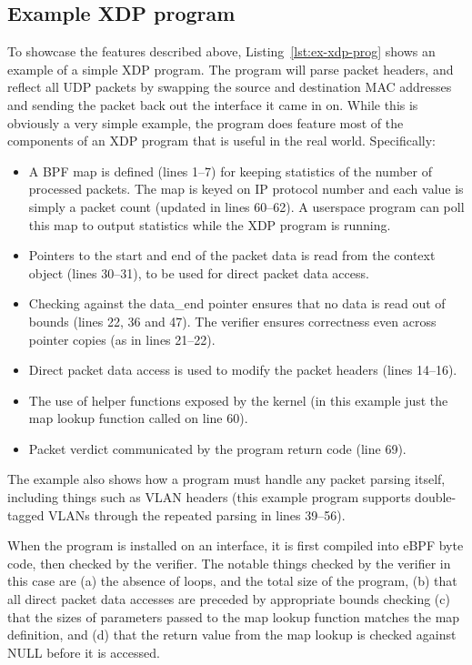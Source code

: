\documentclass[sigconf]{acmart}
\begin{document}
\subsection{Example XDP program}
\label{sec:example-xdp-program}


To showcase the features described above, Listing~\ref{lst:ex-xdp-prog} shows an
example of a simple XDP program. The program will parse packet headers, and
reflect all UDP packets by swapping the source and destination MAC addresses and
sending the packet back out the interface it came in on. While this is obviously
a very simple example, the program does feature most of the components of an XDP
program that is useful in the real world. Specifically:

\begin{itemize}
\item A BPF map is defined (lines 1--7) for keeping statistics of the number of
  processed packets. The map is keyed on IP protocol number and each value is
  simply a packet count (updated in lines 60--62). A userspace program can poll
  this map to output statistics while the XDP program is running.
\item Pointers to the start and end of the packet data is read from the context
  object (lines 30--31), to be used for direct packet data access.
\item Checking against the data\_end pointer ensures that no data is read out of
  bounds (lines 22, 36 and 47). The verifier ensures correctness even across
  pointer copies (as in lines 21--22).
\item Direct packet data access is used to modify the packet headers (lines
  14--16).
\item The use of helper functions exposed by the kernel (in this example just
  the map lookup function called on line 60).
\item Packet verdict communicated by the program return code (line 69).
\end{itemize}

The example also shows how a program must handle any packet parsing itself,
including things such as VLAN headers (this example program supports
double-tagged VLANs through the repeated parsing in lines 39--56).

When the program is installed on an interface, it is first compiled into eBPF
byte code, then checked by the verifier. The notable things checked by the
verifier in this case are (a) the absence of loops, and the total size of the
program, (b) that all direct packet data accesses are preceded by appropriate
bounds checking (c) that the sizes of parameters passed to the map lookup
function matches the map definition, and (d) that the return value from the map
lookup is checked against NULL before it is accessed.
\end{document}

